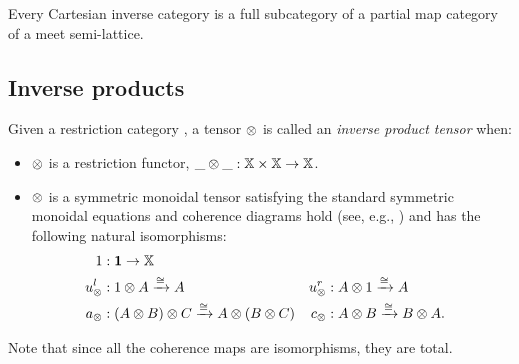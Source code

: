 \begin{corollary}
  Every Cartesian inverse category is a full subcategory of a partial map category of a meet
  semi-lattice.
\end{corollary}



\subsection{Inverse products} %
\label{sub:inverse_products}

\begin{definition}\label{def:inverse_product_tensor}
  Given a restriction category \X, a tensor $\otimes$ is called an \emph{inverse product tensor}
  when:
\begin{itemize}
  \item $\otimes$ is a restriction functor, $\_ \otimes \_ : \mathbb{X} \times \mathbb{X} \to \mathbb{X}$.
  \item $\otimes$ is a symmetric monoidal tensor satisfying the standard symmetric monoidal equations and
    coherence diagrams hold (see, e.g., \cite{maclan97:categorieswrkmath}) and has the following
    natural isomorphisms:
    \begin{align*}
      1 &: \boldsymbol{1}\to \mathbb{X} \\
      u_{\otimes}^l &: 1 \otimes A \xrightarrow{\cong} A
      &u_{\otimes}^r &: A \otimes 1 \xrightarrow{\cong} A\\
      a_{\otimes} &: (A \otimes B) \otimes C \xrightarrow{\cong} A \otimes (B \otimes C)
      &c_{\otimes} &: A \otimes B \xrightarrow{\cong} B \otimes A.
    \end{align*}
  \end{itemize}
  Note that since all the coherence maps are isomorphisms, they are total.
\end{definition}

